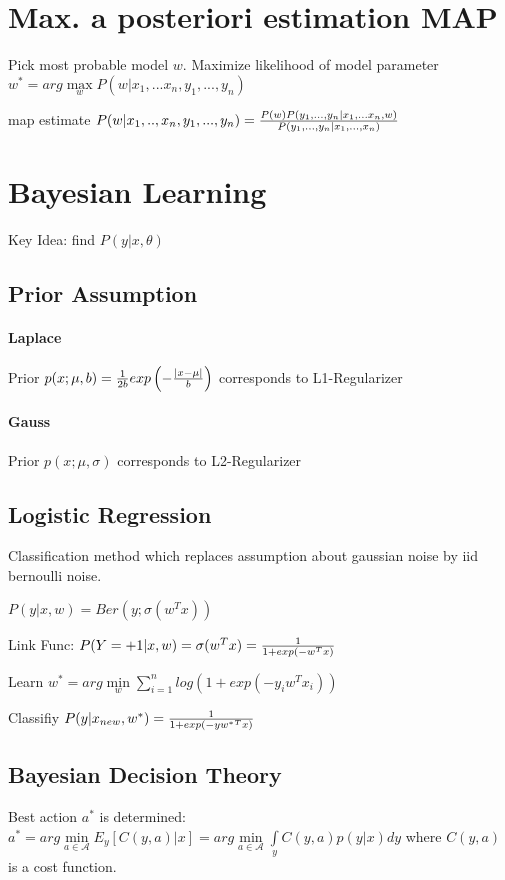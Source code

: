 \documentclass[11pt,twocolumn]{article}
\begin{document}
\section{Max. a posteriori estimation MAP}
Pick most probable model $w$. Maximize likelihood of model parameter $w^* = arg \max \limits_w P(w|x_1,...x_n,y_1,...,y_n) $ 

map estimate $P(w|x_1,..,x_n,y_1,...,y_n) = {{P(w)P(y_1,...,y_n|x_1,...x_n,w)}\over{P(y_1,...,y_n|x_1,...,x_n)}}$	
	
\section{Bayesian Learning}
Key Idea: find $P(y|x,\theta)$
\subsection{Prior Assumption}

\paragraph{Laplace} Prior $p(x;\mu, b) = {1 \over {2b}} exp \left( - {{|x - \mu|}\over{b}} \right)$ corresponds to L1-Regularizer

\paragraph{Gauss} Prior $p(x;\mu, \sigma)$ corresponds to L2-Regularizer

\subsection{Logistic Regression}
Classification method which replaces assumption about gaussian noise by iid bernoulli noise.

$P(y|x,w) = Ber(y; \sigma(w^Tx))$


Link Func: $P(Y=+1|x,w) =  \sigma(w^Tx) = 	{1 \over {1+exp(-w^Tx)}}$

Learn $w^* = arg \min \limits_w \sum \limits_{i=1}^n log \left( 1 + exp(-y_iw^Tx_i) \right)$

Classifiy $P(y|x_{new}, w^* ) = {1 \over {1+exp(-y{w^*}^Tx)}}$

\subsection{Bayesian Decision Theory}

Best action $a^*$ is determined: $a^* = arg \min \limits_{a \in \mathcal{A}} E_y[C(y,a)|x] = arg \min \limits_{a \in \mathcal{A}} \int \limits_y C(y,a)p(y|x) dy$ where $C(y,a)$ is a cost function.
\end{document}
